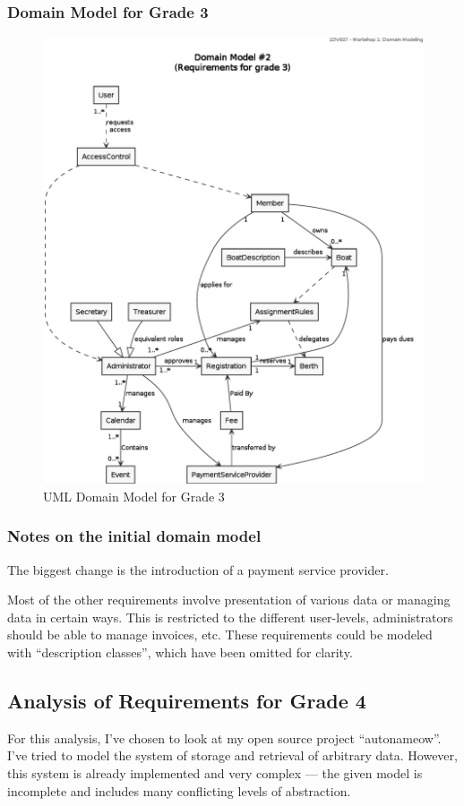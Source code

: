 \subsubsection{Domain Model for Grade 3}
\begin{figure}[htbp]
  \centering
  \includegraphics[width=\linewidth]{uml/domain-model_2.eps}
  \caption{UML Domain Model for Grade 3}
  \label{fig:uml-domain2}
\end{figure}

\subsubsection{Notes on the initial domain model}
The biggest change is the introduction of a payment service provider.

Most of the other requirements involve presentation of various data or managing
data in certain ways.  This is restricted to the different user-levels,
administrators should be able to manage invoices, etc.  These requirements
could be modeled with ``description classes'', which have been omitted for
clarity.


\subsection{Analysis of Requirements for Grade 4}
For this analysis, I've chosen to look at my open source project
``autonameow''\cite{js:autonameow-github}.  I've tried to model the system of
storage and retrieval of arbitrary data. However, this system is already
implemented and very complex --- the given model is incomplete and includes
many conflicting levels of abstraction.


